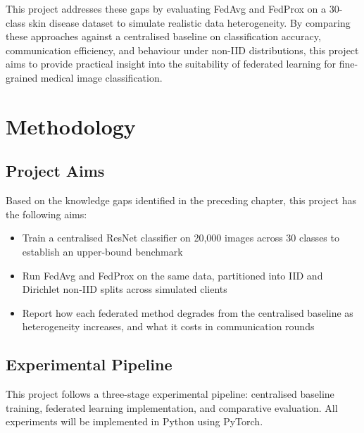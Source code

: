 \documentclass[12pt,openany,a4paper]{book}
\begin{document}
This project addresses these gaps by evaluating FedAvg and FedProx on a 30-class skin disease dataset to simulate realistic data heterogeneity. By comparing these approaches against a centralised baseline on classification accuracy, communication efficiency, and behaviour under non-IID distributions, this project aims to provide practical insight into the suitability of federated learning for fine-grained medical image classification.


\chapter{Methodology}

\section{Project Aims}
Based on the knowledge gaps identified in the preceding chapter, this project has the following aims:
\begin{itemize}
  \item Train a centralised ResNet classifier on 20,000 images across 30 classes to establish an upper-bound benchmark
  \item Run FedAvg and FedProx on the same data, partitioned into IID and Dirichlet non-IID splits across simulated clients
  \item Report how each federated method degrades from the centralised baseline as heterogeneity increases, and what it costs in communication rounds
\end{itemize}

\section{Experimental Pipeline}
This project follows a three-stage experimental pipeline: centralised baseline training, federated learning implementation, and comparative evaluation. All experiments will be implemented in Python using PyTorch.
\end{document}
